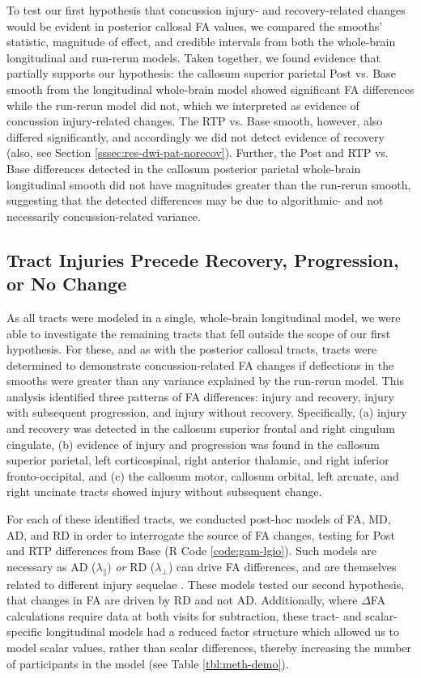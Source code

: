 \documentclass[12pt]{article}
\begin{document}
To test our first hypothesis that concussion injury- and recovery-related changes would be evident in posterior callosal FA values, we compared the smooths' statistic, magnitude of effect, and credible intervals from both the whole-brain longitudinal and run-rerun models. Taken together, we found evidence that partially supports our hypothesis: the callosum superior parietal Post vs. Base smooth from the longitudinal whole-brain model showed significant FA differences while the run-rerun model did not, which we interpreted as evidence of concussion injury-related changes. The RTP vs. Base smooth, however, also differed significantly, and accordingly we did not detect evidence of recovery (also, see Section \ref{sssec:res-dwi-pat-norecov}). Further, the Post and RTP vs. Base differences detected in the callosum posterior parietal whole-brain longitudinal smooth did not have magnitudes greater than the run-rerun smooth, suggesting that the detected differences may be due to algorithmic- and not necessarily concussion-related variance.


\subsection{Tract Injuries Precede Recovery, Progression, or No Change}
\label{ssec:res-dwi-pat}
As all tracts were modeled in a single, whole-brain longitudinal model, we were able to investigate the remaining tracts that fell outside the scope of our first hypothesis. For these, and as with the posterior callosal tracts, tracts were determined to demonstrate concussion-related FA changes if deflections in the smooths were greater than any variance explained by the run-rerun model. This analysis identified three patterns of FA differences: injury and recovery, injury with subsequent progression, and injury without recovery. Specifically, (a) injury and recovery was detected in the callosum superior frontal and right cingulum cingulate, (b) evidence of injury and progression was found in the callosum superior parietal, left corticospinal, right anterior thalamic, and right inferior fronto-occipital, and (c) the callosum motor, callosum orbital, left arcuate, and right uncinate tracts showed injury without subsequent change.

For each of these identified tracts, we conducted post-hoc models of FA, MD, AD, and RD in order to interrogate the source of FA changes, testing for Post and RTP differences from Base (R Code \ref{code:gam-lgio}). Such models are necessary as AD ($\lambda_\parallel$) \textit{or} RD ($\lambda_\perp$) can drive FA differences, and are themselves related to different injury sequelae \parencite{winklewski2018UnderstandingPhysiopathologyAxial}. These models tested our second hypothesis, that changes in FA are driven by RD and not AD. Additionally, where $\Delta$FA calculations require data at both visits for subtraction, these tract- and scalar-specific longitudinal models had a reduced factor structure which allowed us to model scalar values, rather than scalar differences, thereby increasing the number of participants in the model (see Table \ref{tbl:meth-demo}).
\end{document}
